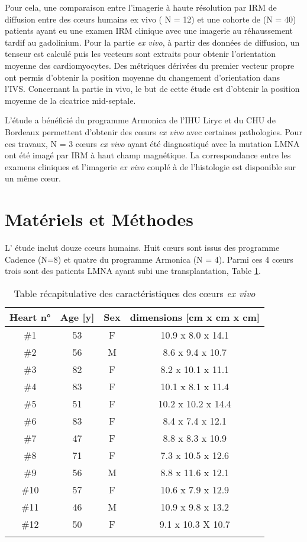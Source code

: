 Pour cela, une comparaison entre l’imagerie à haute résolution par IRM de diffusion entre des cœurs humains ex vivo ( N = 12) et une cohorte de (N = 40) patients ayant eu une examen IRM clinique avec une imagerie au réhaussement tardif au gadolinium. Pour la partie \textit{ex vivo}, à partir des données de diffusion, un tenseur est calculé puis les vecteurs sont extraits pour obtenir l’orientation moyenne des cardiomyocytes. Des métriques dérivées du premier vecteur propre ont permis d’obtenir la position moyenne du changement d’orientation dans l’IVS. Concernant la partie in vivo, le but de cette étude est d’obtenir la position moyenne de la cicatrice mid-septale. 

L’étude a bénéficié du programme Armonica de l’IHU Liryc et du CHU de Bordeaux permettent d’obtenir des cœurs \textit{ex vivo} avec certaines pathologies. Pour ces travaux, N = 3 cœurs \textit{ex vivo} ayant été diagnostiqué avec la mutation LMNA ont été imagé par IRM à haut champ magnétique. La correspondance entre les examens cliniques et l’imagerie \textit{ex vivo} couplé à de l’histologie est disponible sur un même cœur. 

\section{Matériels et Méthodes}

L’ étude inclut douze cœurs humains. Huit cœurs sont issus des programme Cadence (N=8) et quatre du programme Armonica (N = 4). Parmi ces 4 cœurs trois sont des patients LMNA ayant subi une transplantation, Table \ref{tab:coeurs}. 

\begin{table}[!ht]
\large
\begin{tabular}{cccc}
\hline
\textbf{Heart n°}  &  \textbf{Age [y]} & \textbf{Sex} & \textbf{dimensions [cm x cm x cm]} \\
\hline
\#1 &   53 &    F &   10.9 x 8.0 x 14.1 \\
\#2  &   56 &    M &    8.6 x 9.4 x 10.7  \\
\#3 &   82 &    F &   8.2 x 10.1 x 11.1 \\
\#4 &   83 &    F &  10.1 x 8.1 x 11.4   \\
\#5 & 51& F & 10.2 x 10.2 x 14.4\\ 
\#6& 83& F & 8.4 x 7.4 x 12.1\\
\#7 & 47& F & 8.8 x 8.3 x 10.9\\
\#8 & 71 & F & 7.3 x 10.5 x 12.6 \\
\#9 & 56& M & 8.8 x 11.6 x 12.1\\
\hline
\hline
\#10 & 57 & F & 10.6 x 7.9 x 12.9 \\
\#11 & 46 & M & 10.9 x 9.8 x 13.2  \\
\#12 & 50 & F & 9.1 x 10.3 X 10.7 \\

\hline
\label{tab:coeurs}
\end{tabular}
\caption{Table récapitulative des caractéristiques des cœurs \textit{ex vivo}}
\end{table}


